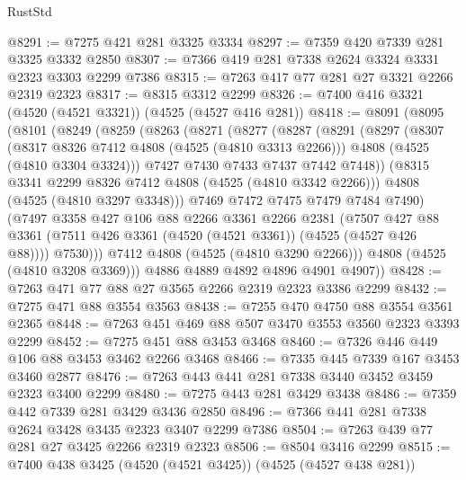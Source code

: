 \begin{lexlean}{RustStd}
\begin{coremodule}
{\begin{coremodule}
{{{{{{{{{{{{{{@8291 := @7275 @421 @281 @3325 @3334
@8297 := @7359 @420 @7339 @281 @3325 @3332 @2850
@8307 := @7366 @419 @281 @7338 @2624 @3324 @3331 @2323 @3303 @2299 @7386
@8315 := @7263 @417 @77 @281 @27 @3321 @2266 @2319 @2323
@8317 := @8315 @3312 @2299
@8326 := @7400 @416 @3321 (@4520 (@4521 @3321)) (@4525 (@4527 @416 @281))
@8418 := @8091
    (@8095
      (@8101
        (@8249
          (@8259
            (@8263
              (@8271
                (@8277
                  (@8287
                    (@8291
                      (@8297
                        (@8307
                          (@8317 @8326 @7412 @4808 (@4525 (@4810 @3313 @2266)))
                          @4808
                          (@4525 (@4810 @3304 @3324)))
                        @7427
                        @7430
                        @7433
                        @7437
                        @7442
                        @7448))
                    (@8315 @3341 @2299 @8326 @7412 @4808 (@4525 (@4810 @3342 @2266)))
                    @4808
                    (@4525 (@4810 @3297 @3348)))
                  @7469
                  @7472
                  @7475
                  @7479
                  @7484
                  @7490)
                (@7497
                  @3358
                  @427
                  @106
                  @88
                  @2266
                  @3361
                  @2266
                  @2381
                  (@7507
                    @427
                    @88
                    @3361
                    (@7511 @426 @3361 (@4520 (@4521 @3361)) (@4525 (@4527 @426 @88))))
                  @7530)))
            @7412
            @4808
            (@4525 (@4810 @3290 @2266)))
          @4808
          (@4525 (@4810 @3208 @3369)))
        @4886
        @4889
        @4892
        @4896
        @4901
        @4907))
@8428 := @7263 @471 @77 @88 @27 @3565 @2266 @2319 @2323 @3386 @2299
@8432 := @7275 @471 @88 @3554 @3563
@8438 := @7255 @470 @4750 @88 @3554 @3561 @2365
@8448 := @7263 @451 @469 @88 @507 @3470 @3553 @3560 @2323 @3393 @2299
@8452 := @7275 @451 @88 @3453 @3468
@8460 := @7326 @446 @449 @106 @88 @3453 @3462 @2266 @3468
@8466 := @7335 @445 @7339 @167 @3453 @3460 @2877
@8476 := @7263 @443 @441 @281 @7338 @3440 @3452 @3459 @2323 @3400 @2299
@8480 := @7275 @443 @281 @3429 @3438
@8486 := @7359 @442 @7339 @281 @3429 @3436 @2850
@8496 := @7366 @441 @281 @7338 @2624 @3428 @3435 @2323 @3407 @2299 @7386
@8504 := @7263 @439 @77 @281 @27 @3425 @2266 @2319 @2323
@8506 := @8504 @3416 @2299
@8515 := @7400 @438 @3425 (@4520 (@4521 @3425)) (@4525 (@4527 @438 @281))
}}}}}}}}}}}}}}
\end{coremodule}}
\end{coremodule}
\end{lexlean}
